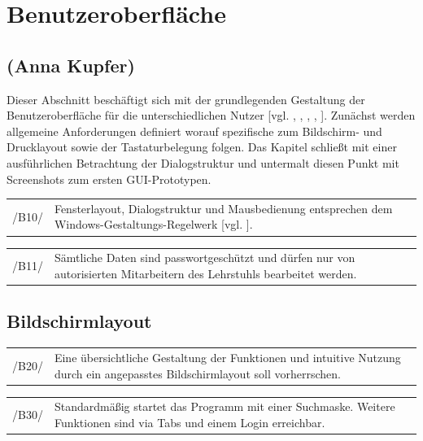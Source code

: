 \section{Benutzeroberfläche}
\label{sec:Benutzeroberfläche}

\subsection*{(Anna Kupfer)}

Dieser Abschnitt beschäftigt sich mit der grundlegenden Gestaltung der Benutzeroberfläche für die unterschiedlichen Nutzer [vgl. \cite{UniRos12b}, \cite{UniRos12c}, \cite{balz1996} \cite{Balzert2009}, \cite{Schae12}, \cite{Jurij07}]. Zunächst werden allgemeine Anforderungen definiert worauf spezifische zum Bildschirm- und Drucklayout sowie der Tastaturbelegung folgen. Das Kapitel schließt mit einer ausführlichen Betrachtung der Dialogstruktur und untermalt diesen Punkt mit Screenshots zum ersten GUI-Prototypen.


\begin{tabular}{p{1.5cm}p{14.5cm}}
 /B10/	& Fensterlayout, Dialogstruktur und Mausbedienung entsprechen dem Windows-Gestaltungs-Regelwerk [vgl. \cite{microsoft1995windows}]. \\[0.25cm]	 
\end{tabular}

\begin{tabular}{p{1.5cm}p{14.5cm}}
 /B11/	& Sämtliche Daten sind passwortgeschützt und dürfen nur von autorisierten Mitarbeitern des Lehrstuhls bearbeitet werden. \\[0.25cm]	 
\end{tabular}


\subsection{Bildschirmlayout}

\begin{tabular}{p{1.5cm}p{14.5cm}}
 /B20/	& Eine übersichtliche Gestaltung der Funktionen und intuitive Nutzung durch ein angepasstes Bildschirmlayout soll vorherrschen. \\[0.25cm]	 
\end{tabular}	

\begin{tabular}{p{1.5cm}p{14.5cm}}
 /B30/	& Standardmäßig startet das Programm mit einer Suchmaske. Weitere Funktionen sind via Tabs und einem Login erreichbar. \\[0.25cm]	 
\end{tabular}


